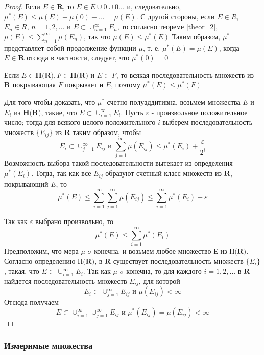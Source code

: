 \begin{proof}	Если $E \in \textbf{R}$, то $E \in E \cup 0 \cup 0 ...$ и, следовательно, $\mu^{*}(E) \leq \mu(E) + \mu(0) + ... = \mu(E)$. С другой стороны, если $E \in R$, $E_n \in R$, $n = 1, 2, ...$ и $E \subset \cup_{n = 1}^{\infty}E_n$, то согласно теореме \ref{theor_2}, $\mu(E) \leq \sum_{n = 1}^{\infty}\mu(E_n)$, так что $\mu(E) \leq \mu^{*}(E)$
Таким образом, $\mu^{*}$ представляет собой продолжение функции $\mu$, т. е. $\mu^{*}(E) = \mu(E)$, когда $E \in \textbf{R}$ отсюда в частности, следует, что  $\mu^{*}(0) = 0$

Если $E \in \textbf{H(R)}, F \in \textbf{H(R)}$ и $E \subset F$, то всякая последовательность множеств из $\textbf{R}$ покрывающая $F$ покрывает и $E$, поэтому $\mu^{*}(E) \leq \mu^{*}(F)$ 

Для того чтобы доказать, что $\mu^{*}$ счетно-полуаддитивна, возьмем множества $E$ и $E_i$ из $\textbf{H(R)}$, такие, что $E \subset \cup_{i = 1}^{\infty} E_i$. Пусть $\varepsilon$ - произвольное положительное число; тогда для всякого целого положительного $i$ выберем последовательность множеств $\{ E_{ij} \}$ из $\textbf{R}$ таким образом, чтобы 
$$
	E_i \subset \cup_{j = 1}^{\infty}E_{ij} \text{  и  } \sum_{j = 1}^{\infty}\mu(E_{ij}) \leq \mu^{*}(E_i) + \frac{\varepsilon}{2^{i}}
$$
Возможность выбора такой последовательности вытекает из определения $\mu^{*}(E_i)$. Тогда, так как все $E_{ij}$ образуют счетный класс множеств из $\textbf{R}$, покрывающий $E$, то 
$$
	\mu^{*}(E) \leq \sum_{i = 1}^{\infty} \sum_{j = 1}^{\infty}\mu(E_{ij}) \leq \sum_{i = 1}^{\infty}\mu^{*}(E_i) + \varepsilon
$$

Так как $\varepsilon$ выбрано произвольно, то
$$
	\mu^{*}(E) \leq \sum_{i = 1}^{\infty}\mu^{*}(E_i)
$$
Предположим, что мера $\mu$ $\sigma$-конечна, и возьмем любое множество $Е$ из $\textbf{Н(R)}$. Согласно определению $\textbf{Н(R)}$, в $\textbf{R}$ существует последовательность множеств $\{E_i\}$, такая, что $E \subset \cup_{i = 1}^{\infty} E_i$. Так как $\mu$ $\sigma$-конечна, то для каждого $i = 1, 2, ...$ в $\textbf{R}$ найдется последовательность множеств  $E_{ij}$, для которой
$$
	E_i \subset \cup_{j = 1}^{\infty}E_{ij} \text{  и  } \mu(E_{ij}) < \infty
$$
Отсюда получаем
$$
	E \subset \cup_{i = 1}^{\infty} \cup_{j = 1}^{\infty}E_{ij} \text{  и  } \mu^{*}(E_{ij}) = \mu(E_{ij}) < \infty
$$
\end{proof}

\subsubsection{Измеримые множества}

